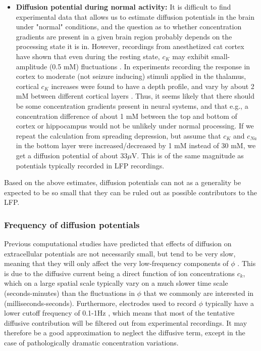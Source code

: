 \begin{itemize}
\item{\bf Diffusion potential during normal activity:} It is difficult to find experimental data that allows us to estimate diffusion potentials in the brain under "normal" conditions, and the question as to whether concentration gradients are present in a given brain region probably depends on the processing state it is in. However, recordings from anesthetized cat cortex have shown that even during the resting state, $c_K$ may exhibit small-amplitude (0.5 mM) fluctuations \cite{MCCREERY1983}. In experiments recording the response in cortex to moderate (not seizure inducing) stimuli applied in the thalamus, cortical $c_K$ increases were found to have a depth profile, and vary by about 2 mM between different cortical layers \cite{Cordingley1978}. Thus, it seems likely that there should be some concentration gradients present in neural systems, and that e.g., a concentration difference of about 1 mM between the top and bottom of cortex or hippocampus would not be unlikely under normal processing. If we repeat the calculation from spreading depression, but assume that $c_{K}$ and $c_{Na}$ in the bottom layer were increased/decreased by 1 mM instead of 30 mM, we get a diffusion potential of about $33 \mu$V. This is of the same magnitude as potentials typically recorded in LFP recordings. 

\end{itemize}

Based on the above estimates, diffusion potentials can not as a generality be expected to be so small that they can be ruled out as possible contributors to the LFP. 


\subsubsection{Frequency of diffusion potentials}

Previous computational studies have predicted that effects of diffusion on extracellular potentials are not necessarily small, but tend to be very slow, meaning that they will only affect the very low-frequency components of $\phi$ \citep{Halnes2016, Halnes2017}. This is due to the diffusive current being a direct function of ion concentrations $c_k$, which on a large spatial scale typically vary on a much slower time scale (seconds-minutes) than the fluctuations in $\phi$ that we commonly are interested in (milliseconds-seconds). Furthermore, electrodes used to record $\phi$ typically have a lower cutoff frequency of 0.1-1Hz \citep{Einevoll2013}, which means that most of the tentative diffusive contribution will be filtered out from experimental recordings. It may therefore be a good approximation to neglect the diffusive term, except in the case of pathologically dramatic concentration variations.
